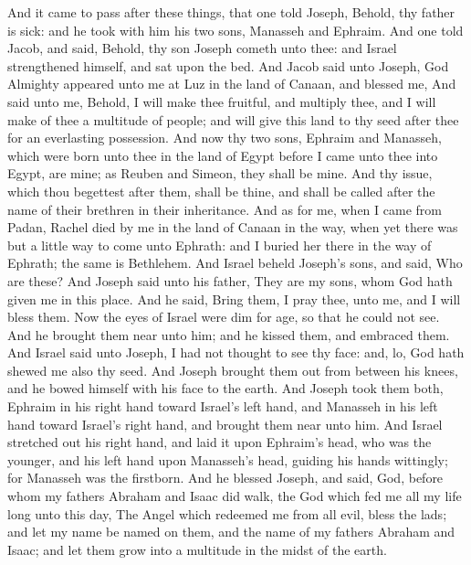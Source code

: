 \begin{biblechapter} %
 And it came to pass after these things, that one told Joseph, Behold, thy father is sick: and he took with him his two sons, Manasseh and Ephraim.
\verse And one told Jacob, and said, Behold, thy son Joseph cometh unto thee: and Israel strengthened himself, and sat upon the bed.
\verse And Jacob said unto Joseph, God Almighty appeared unto me at Luz in the land of Canaan, and blessed me,
\verse And said unto me, Behold, I will make thee fruitful, and multiply thee, and I will make of thee a multitude of people; and will give this land to thy seed after thee for an everlasting possession.
\verse And now thy two sons, Ephraim and Manasseh, which were born unto thee in the land of Egypt before I came unto thee into Egypt, are mine; as Reuben and Simeon, they shall be mine.
\verse And thy issue, which thou begettest after them, shall be thine, and shall be called after the name of their brethren in their inheritance.
\verse And as for me, when I came from Padan, Rachel died by me in the land of Canaan in the way, when yet there was but a little way to come unto Ephrath: and I buried her there in the way of Ephrath; the same is Bethlehem.
\verse And Israel beheld Joseph's sons, and said, Who are these?
\verse And Joseph said unto his father, They are my sons, whom God hath given me in this place. And he said, Bring them, I pray thee, unto me, and I will bless them.
\verse Now the eyes of Israel were dim for age, so that he could not see. And he brought them near unto him; and he kissed them, and embraced them.
\verse And Israel said unto Joseph, I had not thought to see thy face: and, lo, God hath shewed me also thy seed.
\verse And Joseph brought them out from between his knees, and he bowed himself with his face to the earth.
\verse And Joseph took them both, Ephraim in his right hand toward Israel's left hand, and Manasseh in his left hand toward Israel's right hand, and brought them near unto him.
\verse And Israel stretched out his right hand, and laid it upon Ephraim's head, who was the younger, and his left hand upon Manasseh's head, guiding his hands wittingly; for Manasseh was the firstborn.
\verse And he blessed Joseph, and said, God, before whom my fathers Abraham and Isaac did walk, the God which fed me all my life long unto this day,
\verse The Angel which redeemed me from all evil, bless the lads; and let my name be named on them, and the name of my fathers Abraham and Isaac; and let them grow into a multitude in the midst of the earth.

\end{biblechapter}
